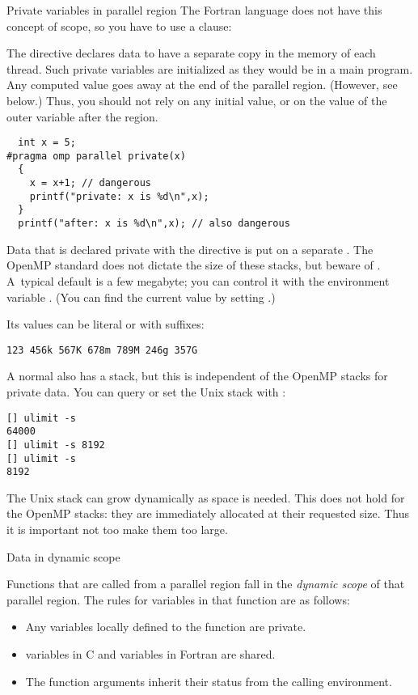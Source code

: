 \begin{fortrannote}{Private variables in parallel region}
  The Fortran language does not have this concept of scope, so you have to use a
   clause:
\end{fortrannote}

The  directive declares data to have a separate copy 
in the memory of each thread. 
Such private variables are initialized as they would be in a main program.
Any computed value goes away at the end 
of the parallel region. (However, see below.)
Thus, you should not rely on any initial value, or on the value of the outer variable
after the region.

\begin{lstlisting}
  int x = 5;
#pragma omp parallel private(x)
  {
    x = x+1; // dangerous
    printf("private: x is %d\n",x);
  }
  printf("after: x is %d\n",x); // also dangerous
\end{lstlisting}

Data that is declared private with the  directive is
put on a separate .
The OpenMP standard
does not dictate the size of these stacks,
but beware of .
A~typical default is a few megabyte;
you can control it with the environment variable
.
(You can find the current value by setting .)

Its values can be literal or with suffixes:
\begin{verbatim}
123 456k 567K 678m 789M 246g 357G
\end{verbatim}

A normal  also has a stack, but this is
independent of the OpenMP stacks for private data. You can query or
set the Unix stack with :
\begin{verbatim}
[] ulimit -s
64000
[] ulimit -s 8192
[] ulimit -s
8192
\end{verbatim}
The Unix stack can grow dynamically as space is needed. This does not
hold for the OpenMP stacks: they are immediately allocated at their
requested size. Thus it is important not too make them too large.

 {Data in dynamic scope}

Functions that are called from a parallel region fall in the
\emph{dynamic scope} of that
parallel region. The rules for variables in that function are as follows:
\begin{itemize}
\item Any variables locally defined to the function are private.
\item {} variables in C and  variables in Fortran
  are shared.
\item The function arguments inherit their status from the calling environment.
\end{itemize}

